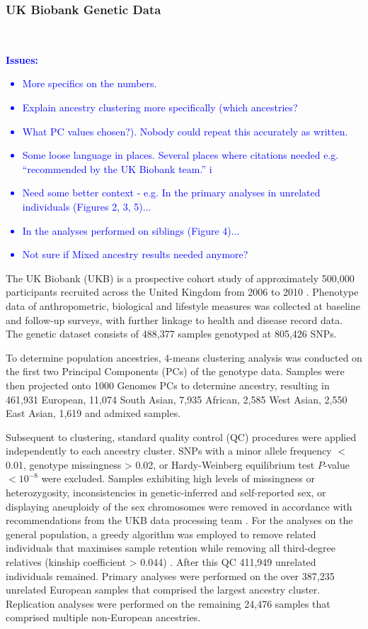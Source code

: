 \documentclass[times]{zHenriquesLab-StyleBioRxiv}
\newcommand\pcomment[1]{\textcolor{blue}{\textbf{Issues:} \footnotesize{#1}}}
\begin{document}
\subsubsection*{UK Biobank Genetic Data} ~\\

\pcomment{
\begin{itemize} 
\item  More specifics on the numbers. 
\item  Explain ancestry clustering more specifically (which ancestries?
\item  What PC values chosen?). Nobody could repeat this accurately as written. 
\item  Some loose language in places. Several places where citations needed e.g. “recommended by the UK Biobank team.” i
\item  Need some better context - e.g. In the primary analyses in unrelated individuals (Figures 2, 3, 5)...
\item  In the analyses performed on siblings (Figure 4)... 
\item  Not sure if Mixed ancestry results needed anymore?
\end{itemize}
}

The UK Biobank (UKB) is a prospective cohort study of approximately
500,000 participants recruited across the United Kingdom from 2006 to
2010 \citep{ukb}. Phenotype data of anthropometric, biological and
lifestyle measures was collected at baseline and follow-up surveys, with
further linkage to health and disease record data. The genetic dataset
consists of 488,377 samples genotyped at 805,426 SNPs.

To determine population ancestries, 4-means clustering analysis was
conducted on the first two Principal Components (PCs) of the genotype
data. Samples were then projected onto 1000 Genomes PCs to determine
ancestry, resulting in 461,931 European, 11,074 South Asian, 7,935
African, 2,585 West Asian, 2,550 East Asian, 1,619 and admixed
samples.

Subsequent to clustering, standard quality control (QC) procedures
were applied independently to each ancestry cluster. SNPs with a minor
allele frequency $<$ 0.01, genotype missingness > 0.02, or
Hardy-Weinberg equilibrium test $P$-value $< 10^{-8}$ were
excluded. Samples exhibiting high levels of missingness or
heterozygosity, inconsistencies in genetic-inferred and self-reported
sex, or displaying aneuploidy of the sex chromosomes were removed in
accordance with recommendations from the UKB data processing team
\citep{ukb_qc}.  For the analyses on the general population, a greedy
algorithm was employed to remove related individuals that maximises
sample retention while removing all third-degree relatives (kinship
coefficient > 0.044) \citep{erase}.  After this QC 411,949 unrelated
individuals remained.  Primary analyses were performed on the over
387,235 unrelated European samples that comprised the largest ancestry
cluster. Replication analyses were performed on the remaining 24,476
samples that comprised multiple non-European ancestries.
\end{document}
